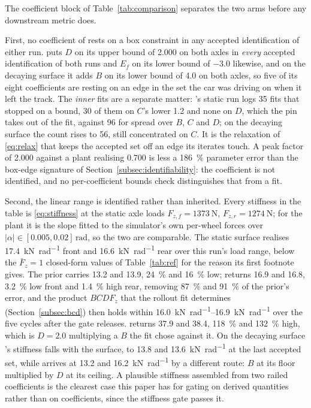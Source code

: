 The coefficient block of Table~\ref{tab:comparison} separates the two arms
before any downstream metric does.

First, no coefficient of \oursarm{} rests on a box constraint in any accepted
identification of either run. \basearm{} puts $D$ on its upper bound of
\num{2.000} on both axles in \emph{every} accepted identification of both runs
and $E_{f}$ on its lower bound of \num{-3.0} likewise, and on the decaying
surface it adds $B$ on its lower bound of \num{4.0} on both axles, so five of
its eight coefficients are resting on an edge in the set the car was driving on
when it left the track. The \emph{inner} fits are a separate matter:
\oursarm{}'s static run logs \num{35} fits that stopped on a bound, \num{30} of
them on $C$'s lower \num{1.2} and none on $D$, which the pin takes out of the
fit, against \num{96} for \basearm{} spread over $B$, $C$ and $D$; on the
decaying surface the count rises to \num{56}, still concentrated on $C$. It is the
relaxation of \eqref{eq:relax} that keeps the accepted set off an edge its
iterates touch. A peak factor of \num{2.000} against a plant realising
\num{0.700} is less a \SI{186}{\percent} parameter error than the box-edge
signature of Section~\ref{subsec:identifiability}: the coefficient is not
identified, and no per-coefficient bounds check distinguishes that from a fit.

Second, the linear range is identified rather than inherited. Every stiffness in
the table is \eqref{eq:stiffness} at the static axle loads
$F_{z,f}=\SI{1373}{\newton}$, $F_{z,r}=\SI{1274}{\newton}$; for the plant it is
the slope fitted to the simulator's own per-wheel forces over
$|\alpha|\in[\num{0.005},\num{0.02}]\,\si{\radian}$, so the two are comparable.
The static surface realises \SI{17.4}{\kilo\newton\per\radian} front and
\SI{16.6}{\kilo\newton\per\radian} rear over this run's load range, below the
$\bar F_{z}=1$ closed-form values of Table~\ref{tab:ref} for the reason its
first footnote gives. The prior carries \num{13.2} and \num{13.9},
\SI{24}{\percent} and \SI{16}{\percent} low; \oursarm{} returns \num{16.9} and
\num{16.8}, \SI{3.2}{\percent} low front and \SI{1.4}{\percent} high rear,
removing \SI{87}{\percent} and \SI{91}{\percent} of the prior's error, and the
product $BCDF_{z}$ that the rollout fit determines
(Section~\ref{subsec:bcd}) then holds within
\SIrange{16.0}{16.9}{\kilo\newton\per\radian} over the five cycles after the
gate releases. \basearm{} returns \num{37.9} and \num{38.4},
\SI{118}{\percent} and \SI{132}{\percent} high, which is $D=\num{2.0}$
multiplying a $B$ the fit chose against it. On the decaying surface
\oursarm{}'s stiffness falls with the surface, to \num{13.8} and
\SI{13.6}{\kilo\newton\per\radian} at the last accepted set, while \basearm{}
arrives at \num{13.2} and \SI{16.2}{\kilo\newton\per\radian} by a different
route: $B$ at its floor multiplied by $D$ at its ceiling. A plausible stiffness
assembled from two railed coefficients is the clearest case this paper has for
gating on derived quantities rather than on coefficients, since the stiffness
gate passes it.


